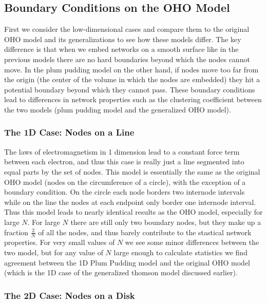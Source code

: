 \documentclass[aps,pre,reprint,superscriptaddress,amsmath,amssymb]{revtex4-1}
\begin{document}


\subsection{Boundary Conditions on the OHO Model}
First we consider the low-dimensional cases and compare them to the original OHO model and its generalizations to see how these models differ.
The key difference is that when we embed networks on a smooth surface like in the previous models there are no hard boundaries beyond which the nodes cannot move.
In the plum pudding model on the other hand, if nodes move too far from the origin (the center of the volume in which the nodes are embedded) they hit a potential boundary beyond which they cannot pass.
These boundary conditions lead to differences in network properties such as the clustering coefficient between the two models (plum pudding model and the generalized OHO model).

\subsubsection{The 1D Case: Nodes on a Line}
The laws of electromagnetism in 1 dimension lead to a constant force term between each electron, and thus this case is really just a line segmented into equal parts by the set of nodes. 
This model is essentially the same as the original OHO model (nodes on the circumference of a circle), with the exception of a boundary condition. 
On the circle each node borders two internode intervals while on the line the nodes at each endpoint only border one internode interval.
Thus this model leads to nearly identical results as the OHO model, especially for large $N$.
For large $N$ there are still only two boundary nodes, but they make up a fraction $\frac{2}{N}$ of all the nodes, and thus barely contribute to the stastical network properties.
For very small values of $N$ we see some minor differences between the two model, but for any value of $N$ large enough to calculate statistics we find agreement between the 1D Plum Pudding model and the original OHO model (which is the 1D case of the generalized thomson model discussed earlier).



\subsubsection{The 2D Case: Nodes on a Disk}
\end{document}

